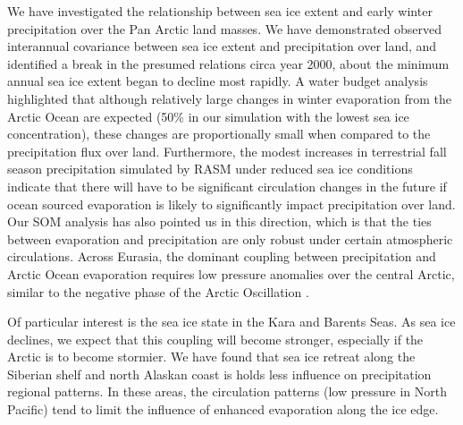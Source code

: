We have investigated the relationship between sea ice extent and early winter precipitation over the Pan Arctic land masses.
We have demonstrated observed interannual covariance between sea ice extent and precipitation over land, and identified a break in the presumed relations circa year 2000, about the minimum annual sea ice extent began to decline most rapidly. %
A water budget analysis highlighted that although relatively large changes in winter evaporation from the Arctic Ocean are expected (50\% in our simulation with the lowest sea ice concentration), these changes are proportionally small when compared to the precipitation flux over land.
Furthermore, the modest increases in terrestrial fall season precipitation simulated by RASM under reduced sea ice conditions indicate that there will have to be significant circulation changes in the future if ocean sourced evaporation is likely to significantly impact precipitation over land.
Our SOM analysis has also pointed us in this direction, which is that the ties between evaporation and precipitation are only robust under certain atmospheric circulations.
Across Eurasia, the dominant coupling between precipitation and Arctic Ocean evaporation requires low pressure anomalies over the central Arctic, similar to the negative phase of the Arctic Oscillation \citep{Thompson_1998}.

Of particular interest is the sea ice state in the Kara and Barents Seas.
As sea ice declines, we expect that this coupling will become stronger, especially if the Arctic is to become stormier.
We have found that sea ice retreat along the Siberian shelf and north Alaskan coast is holds less influence on precipitation regional patterns.
In these areas, the circulation patterns (low pressure in North Pacific) tend to limit the influence of enhanced evaporation along the ice edge.

